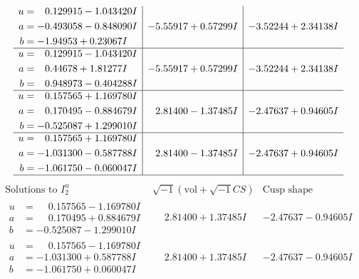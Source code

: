 \documentclass[1p]{elsarticle_modified}
\theoremstyle{definition}
\newcommand{\I}{\sqrt{-1}}
\begin{document}
$$\begin{array}{c|c|c}
\begin{aligned}
u &= \phantom{-}0.129915 - 1.043420 I \\
a &= -0.493058 - 0.848090 I \\
b &= -1.94953 + 0.23067 I\end{aligned}
 & -5.55917 + 0.57299 I & -3.52244 + 2.34138 I \\ \hline\begin{aligned}
u &= \phantom{-}0.129915 - 1.043420 I \\
a &= \phantom{-}0.44678 + 1.81277 I \\
b &= \phantom{-}0.948973 - 0.404288 I\end{aligned}
 & -5.55917 + 0.57299 I & -3.52244 + 2.34138 I \\ \hline\begin{aligned}
u &= \phantom{-}0.157565 + 1.169780 I \\
a &= \phantom{-}0.170495 - 0.884679 I \\
b &= -0.525087 + 1.299010 I\end{aligned}
 & \phantom{-}2.81400 - 1.37485 I & -2.47637 + 0.94605 I \\ \hline\begin{aligned}
u &= \phantom{-}0.157565 + 1.169780 I \\
a &= -1.031300 - 0.587788 I \\
b &= -1.061750 - 0.060047 I\end{aligned}
 & \phantom{-}2.81400 - 1.37485 I & -2.47637 + 0.94605 I\\
 \hline 
 \end{array}$$\newpage$$\begin{array}{c|c|c}  
\text{Solutions to }I^u_{2}& \I (\text{vol} + \sqrt{-1}CS) & \text{Cusp shape}\\
 \hline 
\begin{aligned}
u &= \phantom{-}0.157565 - 1.169780 I \\
a &= \phantom{-}0.170495 + 0.884679 I \\
b &= -0.525087 - 1.299010 I\end{aligned}
 & \phantom{-}2.81400 + 1.37485 I & -2.47637 - 0.94605 I \\ \hline\begin{aligned}
u &= \phantom{-}0.157565 - 1.169780 I \\
a &= -1.031300 + 0.587788 I \\
b &= -1.061750 + 0.060047 I\end{aligned}
 & \phantom{-}2.81400 + 1.37485 I & -2.47637 - 0.94605 I \\ \hline\begin{aligned}

\end{aligned}
\end{array}$$
\end{document}
